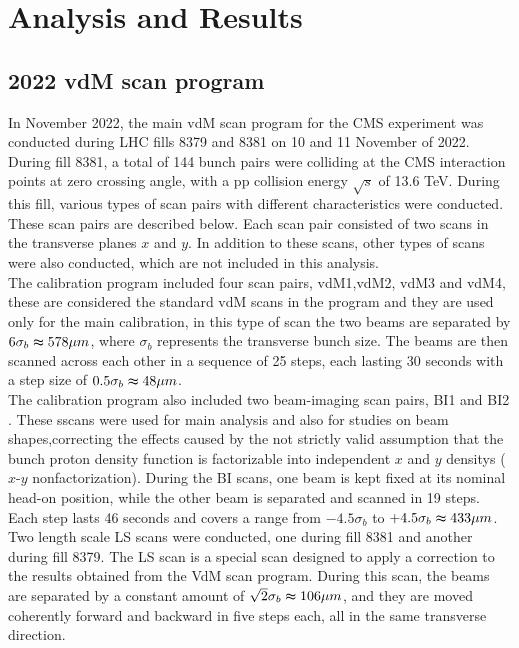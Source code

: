 \chapter{Analysis and Results}


\section{2022 vdM scan program}

In November 2022, the main vdM scan program for the CMS experiment was conducted during LHC fills 8379 and 8381 on 10 and 11 November of 2022. During fill 8381, a total of 144 bunch pairs were colliding at the CMS interaction points at zero crossing angle, with a pp collision energy $\sqrt{s}$ of 13.6 TeV. 
During this fill, various types of scan pairs with different characteristics were conducted. These scan pairs are described below. Each scan pair consisted of two scans in the transverse planes $x$ and $y$. In addition to these scans, other types of scans were also conducted, which are not included in this analysis.\\ %

The calibration program included four scan pairs, vdM1,vdM2, vdM3 and vdM4, these are considered the standard vdM scans in the program and they are used only for the main calibration, in this type of scan the two beams are separated by $6\sigma_{b} \thickapprox 578\mu m$, where $\sigma_{b}$ represents the transverse bunch size. The beams are then scanned across each other in a sequence of 25 steps, each lasting 30 seconds with a step size of $0.5\sigma_{b} \thickapprox 48 \mu m$.\\

The calibration program also included two beam-imaging scan pairs, BI1 and BI2 . These sscans were used for main analysis and also for studies on beam shapes,correcting the effects caused by the not strictly valid assumption that the bunch proton density function is factorizable into independent $x$ and $y$ densitys ($x$-$y$ nonfactorization). During the BI scans, one beam is kept fixed at its nominal head-on position, while the other beam is separated and scanned in 19 steps. Each step lasts 46 seconds and covers a range from $-4.5\sigma_{b}$ to $+4.5\sigma_{b} \thickapprox 433 \mu m$.\\

Two length scale LS scans were conducted, one during fill 8381 and another during fill 8379. The LS scan is a special scan designed to apply a correction to the results obtained from the VdM scan program. During this scan, the beams are separated by a constant amount of $\sqrt{2} \sigma_{b} \thickapprox 106 \mu m$, and they are moved coherently forward and backward in five steps each, all in the same transverse direction.\\

